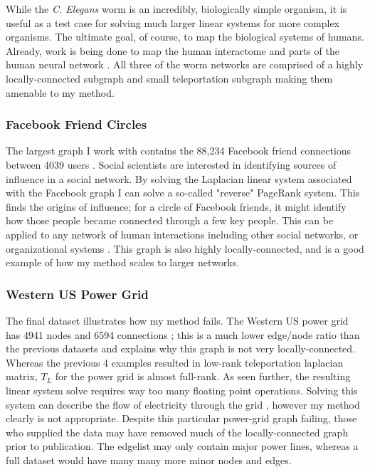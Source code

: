 \documentclass{article}
\begin{document}
While the \textit{C. Elegans} worm is an incredibly, biologically simple organism, it is useful as a test case for solving much larger linear systems for more complex organisms. The ultimate goal, of course, to map the biological systems of humans. Already, work is being done to map the human interactome \cite{Rual:2005,Rolland:2014} and parts of the human neural network \cite{Toga:2012}. All three of the worm networks are comprised of a highly locally-connected subgraph and small teleportation subgraph making them amenable to my method. 

\subsubsection{Facebook Friend Circles}
The largest graph I work with contains the 88,234 Facebook friend connections between 4039 users  \cite{Mcauley:2012}. Social scientists are interested in identifying sources of influence in a social network. By solving the Laplacian linear system associated with the Facebook graph I can solve a so-called "reverse" PageRank system. This finds the origins of influence; for a circle of Facebook friends, it might identify how those people became connected through a few key people. This can be applied to any network of human interactions including other social networks, or organizational systems \cite{Gleich:2015}. This graph is also highly locally-connected, and is a good example of how my method scales to larger networks.


\subsubsection{Western US Power Grid}
The final dataset illustrates how my method fails. The Western US power grid has 4941 nodes and 6594 connections \cite{Watts:1998}; this is a much lower edge/node ratio than the previous datasets and explains why this graph is not very locally-connected. Whereas the previous 4 examples resulted in low-rank teleportation laplacian matrix, $T_L$ for the power grid is almost full-rank. As seen further, the resulting linear system solve requires way too many floating point operations. Solving this system can describe the flow of electricity through the grid \cite{Pagani:2013}, however my method clearly is not appropriate. Despite this particular power-grid graph failing, those who supplied the data may have removed much of the locally-connected graph prior to publication. The edgelist may only contain major power lines, whereas a full dataset would have many many more minor nodes and edges.
\end{document}
